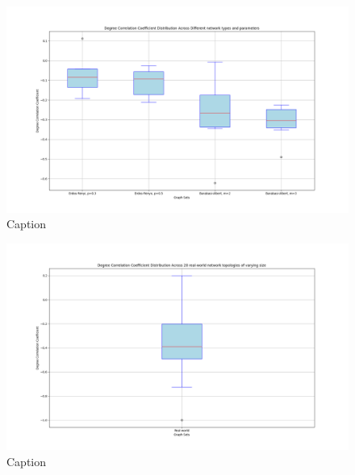 \begin{figure}
    \centering
    \includegraphics[width=0.9\linewidth]{images/FINAL-TOPO-COMP/Degree-coeff-distrib/Distrib-by-param.png}
    \caption{Caption}
    \label{fig:enter-label}
\end{figure}

\begin{figure}
    \centering
    \includegraphics[width=0.9\linewidth]{images/FINAL-TOPO-COMP/Degree-coeff-distrib/Distrib-28-real-world.png}
    \caption{Caption}
    \label{fig:enter-label}
\end{figure}